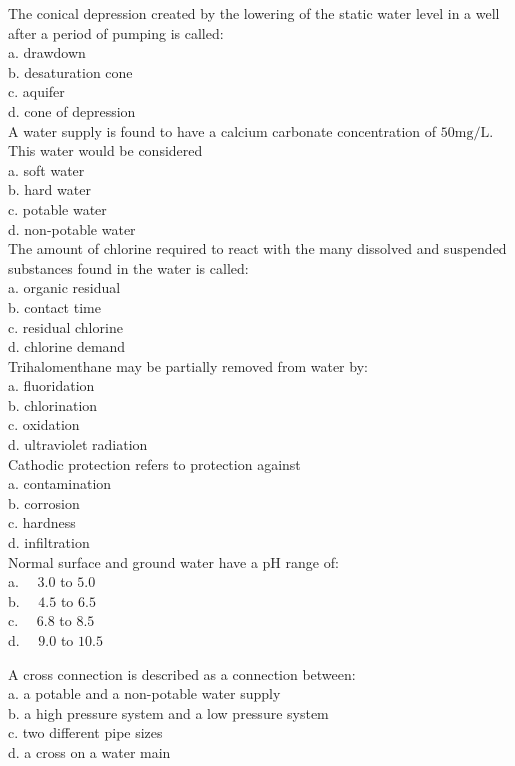 The conical depression created by the lowering of the static water level in a well after a period of pumping is called:\\
a. drawdown\\
b. desaturation cone\\
c. aquifer\\
d. cone of depression \\

A water supply is found to have a calcium carbonate concentration of $50 \mathrm{mg} / \mathrm{L}$. This water would be considered\\
a. soft water\\
b. hard water\\
c. potable water\\
d. non-potable water\\

The amount of chlorine required to react with the many dissolved and suspended substances found in the water is called:\\
a. organic residual\\
b. contact time\\
c. residual chlorine\\
d. chlorine demand\\

Trihalomenthane may be partially removed from water by:\\
a. fluoridation\\
b. chlorination\\
c. oxidation\\
d. ultraviolet radiation\\

Cathodic protection refers to protection against\\
a. contamination\\
b. corrosion\\
c. hardness\\
d. infiltration\\

Normal surface and ground water have a pH range of:\\
a. $\quad 3.0$ to $5.0$\\
b. $\quad 4.5$ to $6.5$\\
c. $\quad 6.8$ to $8.5$\\
d. $\quad 9.0$ to $10.5$ 

A cross connection is described as a connection between:\\
a. a potable and a non-potable water supply\\
b. a high pressure system and a low pressure system\\
c. two different pipe sizes\\
d. a cross on a water main\\

